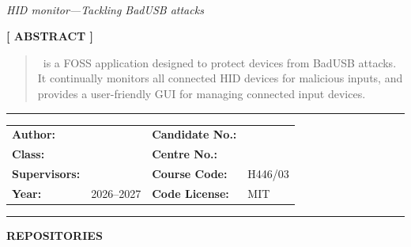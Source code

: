 \documentclass[12pt, a4paper]{article}
\begin{document}
\thispagestyle{empty}

{\Huge \ttfamily \textbf{\projectName}} \\[0.2cm]
{\Large \slshape HID monitor---Tackling BadUSB attacks}

\vspace{1cm}

\centerline{\normalsize \ttfamily \textbf{[ ABSTRACT ]}}
\vspace{0.1cm}

\begin{quotation}
	\noindent
	\textbf{\projectName}\ is a FOSS application designed to protect devices from BadUSB attacks. It continually monitors all connected HID devices for malicious inputs, and provides a user-friendly GUI for managing connected input devices.
\end{quotation}

\vspace{0.1cm}
\rule{\textwidth}{0.25pt}

\vspace{0.1cm}

\noindent
\begin{tabular}{@{} l p{4.2cm} l l @{}}
	\textbf{Author:}      & \candidateName{}   & \textbf{Candidate No.:} & \candidateNum{} \\
	\textbf{Class:}       & \candidateClass{}  & \textbf{Centre No.:}    & \centreNum{}    \\
	\textbf{Supervisors:} & \supervisorNames{} & \textbf{Course Code:}   & H446/03         \\
	\textbf{Year:}        & 2026--2027         & \textbf{Code License:}  & MIT             \\
\end{tabular}

\vspace{0.1cm}
\rule{\textwidth}{0.25pt}

\vspace{0.1cm}

{\ttfamily \textbf{REPOSITORIES}}
\begin{description}[itemsep=1pt]
	\item[\texttt{[src/code]}] \repoCode{}
	\item[\texttt{[src/docs]}] \repoDocs{}
\end{description}

\newpage

\tableofcontents
\newpage


\newpage


% 

\newpage
\printbibliography[heading=bibintoc, title={References}]
\end{document}
